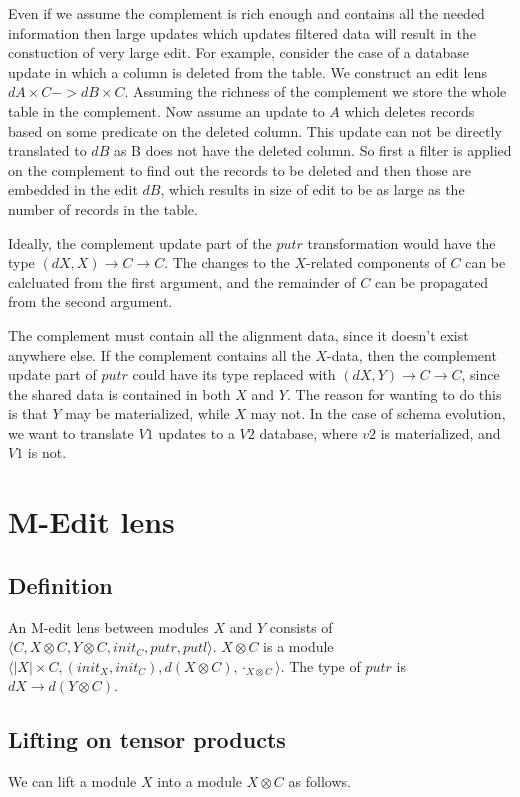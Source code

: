 \documentclass[a4paper,10pt]{article}
\begin{document}
Even if we assume the complement is rich enough and contains all the needed information then large updates which updates filtered data will result in the constuction of very large edit. For example, consider the case of a database update in which a column is deleted from the table. We construct an edit lens $dA \times C -> dB \times C$. Assuming the richness of the complement we store the whole table in the complement. Now assume an update to $A$ which deletes records based on some predicate on the deleted column. This update can not be directly translated to $dB$ as B does not have the deleted column. So first a filter is applied on the complement to find out the records to be deleted and then those are embedded in the edit $dB$, which results in size of edit to be as large as the number of records in the table.

Ideally, the complement update part of the $putr$ transformation would have the type $(dX, X) \to C \to C$. The changes to the $X$-related components of $C$ can be calcluated from the first argument, and the remainder of $C$ can be propagated from the second argument. 

The complement must contain all the alignment data, since it doesn't exist anywhere else. If the complement contains all the $X$-data, then the complement update part of $putr$ could have its type replaced with $(dX, Y) \to C \to C$, since the shared data is contained in both $X$ and $Y$. The reason for wanting to do this is that $Y$ may be materialized, while $X$ may not. 
In the case of schema evolution, we want to translate $V1$ updates to a $V2$ database, where $v2$ is materialized, and $V1$ is not.

\section{M-Edit lens}

\subsection{Definition}
An M-edit lens between modules $X$ and $Y$ consists of $\langle C, X \otimes C, Y \otimes C, init_C, putr, putl \rangle$. $X \otimes C$ is a module $\langle |X| \times C, (init_X, init_C), d(X \otimes C), \cdot_{X \otimes C} \rangle$. The type of $putr$ is $dX \to d(Y \otimes C)$.

\subsection{Lifting on tensor products}
We can lift a module $X$ into a module $X \otimes C$ as follows. 
\end{document}
